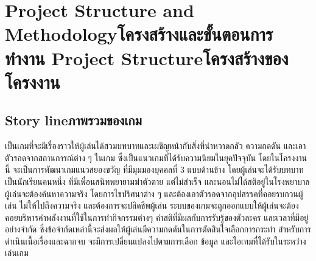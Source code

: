 \chapter{\ifproject%
      \ifenglish Project Structure and Methodology\else โครงสร้างและขั้นตอนการทำงาน\fi
  \else%
      \ifenglish Project Structure\else โครงสร้างของโครงงาน\fi
  \fi
 }



\makeatletter


\makeatother

\section{\ifenglish Story line\else ภาพรวมของเกม\fi }
เป็นเกมที่จะมีเรื่องราวให้ผู้เล่นได้สวมบทบาทและเผชิญหน้ากับสิ่งที่น่าหวาดกลัว ความกดดัน และเอาตัวรอดจากสถานการณ์ต่าง ๆ ในเกม ซึ่งเป็นแนวเกมที่ได้รับความนิยมในยุคปัจจุบัน โดยในโครงงานนี้ จะเป็นการพัฒนาเกมแนวสยองขวัญ ที่มีมุมมองบุคคลที่ 3 แบบด้านข้าง โดยผู้เล่นจะได้รับบทบาทเป็นนักเรียนคนหนึ่ง ที่มีเพื่อนสนิทพยายามฆ่าตัวตาย แต่ไม่สำเร็จ และนอนไม่ได้สติอยู่ในโรงพยาบาล ผู้เล่นจะต้องค้นหาความจริง โดยการไขปริศนาต่าง ๆ และต้องเอาตัวรอดจากอุปสรรคที่คอยรบกวนผู้เล่น ไม่ให้ไปถึงความจริง และต้องการจะปลิดชีพผู้เล่น ระบบของเกมจะถูกออกแบบให้ผู้เล่นจะต้องคอยบริหารค่าพลังงานที่ใช้ในการทำกิจกรรมต่างๆ ค่าสติที่มีผลกับการรับรู้ของตัวละคร และเวลาที่มีอยู่อย่างจำกัด ซึ่งข้อจำกัดเหล่านี้จะส่งผลให้ผู้เล่นมีความกดดันในการตัดสินใจเลือกการกระทำ สำหรับการดำเนินเนื้อเรื่องและฉากจบ จะมีการเปลี่ยนแปลงไปตามการเลือก ข้อมูล และไอเทมที่ได้รับในระหว่างเล่นเกม



